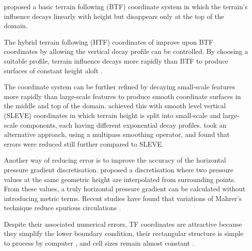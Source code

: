 \textcite{galchen-somerville1975} proposed a basic terrain following (BTF) coordinate system in which the terrain's influence decays linearly with height but disappears only at the top of the domain.    

The hybrid terrain following (HTF) coordinates of \textcite{simmons-burridge1981} improve upon BTF coordinates by allowing the vertical decay profile can be controlled.  By choosing a suitable profile, terrain influence decays more rapidly than BTF to produce surfaces of constant height aloft \autocite{klemp2011}.

The coordinate system can be further refined by decaying small-scale features more rapidly than large-scale features to produce smooth coordinate surfaces in the middle and top of the domain.  \textcite{schaer2002} achieved this with smooth level vertical (SLEVE) coordinates in which terrain height is split into small-scale and large-scale components, each having different exponential decay profiles.    \textcite{klemp2011} took an alternative approach, using a multipass smoothing operator, and found that errors were reduced still further compared to SLEVE.

Another way of reducing error is to improve the accuracy of the horizontal pressure gradient discretisation.  \textcite{mahrer1984} proposed a discretisation where two pressure values at the same geometric height are interpolated from surrounding points.  From these values, a truly horizontal pressure gradient can be calculated without introducing metric terms.  Recent studies have found that variations of Mahrer's technique reduce spurious circulations \parencites{dempsey-davis1998}{klemp2011}{zaengl2012}.  


Despite their associated numerical errors, TF coordinates are attractive because they simplify the lower boundary condition, their rectangular structure is simple to process by computer \autocite{schaer2002}, and cell sizes remain almost constant \autocite{jebens2011}.

